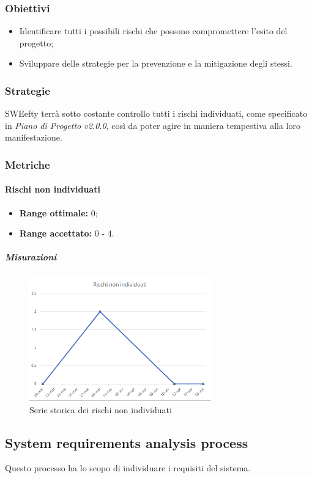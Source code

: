 \subsubsection{Obiettivi}
\begin{itemize}
	\item Identificare tutti i possibili rischi che possono compromettere l'esito del progetto;
	\item Sviluppare delle strategie per la prevenzione e la mitigazione degli stessi.
\end{itemize}
\subsubsection{Strategie}
SWEefty terrà sotto costante controllo tutti i rischi individuati, come specificato in \emph{Piano di Progetto v2.0.0}, così da poter agire in maniera tempestiva alla loro manifestazione.

\subsubsection{Metriche}
\paragraph{Rischi non individuati} \Spazio
	\begin{itemize}
		\item \textbf{Range ottimale: }0;
		\item \textbf{Range accettato: }0 - 4.
	\end{itemize}
    \subparagraph{Misurazioni}
    \begin{figure}[H]
    	\centering 
    	\includegraphics[width=0.7\textwidth]{Images/rischiNI.png}
    	\caption{Serie storica dei rischi non individuati}
    	\label{rischi} 
    \end{figure}

\subsection{System requirements analysis process}
Questo processo ha lo scopo di individuare i requisiti del sistema.
